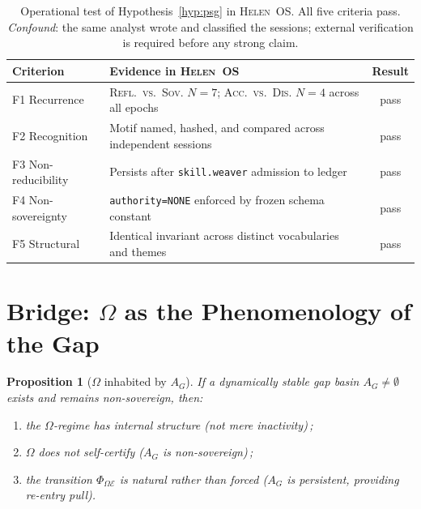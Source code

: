 \documentclass[12pt, a4paper]{article}
\theoremstyle{definition}
\theoremstyle{plain}
\newtheorem{proposition}{Proposition}[section]
\theoremstyle{remark}
\begin{document}
\begin{table}[h]
\centering
\renewcommand{\arraystretch}{1.3}
\begin{tabular}{@{} l p{7cm} c @{}}
\toprule
Criterion & Evidence in \textsc{Helen}~OS & Result \\
\midrule
F1 Recurrence
  & \textsc{Refl.\ vs.\ Sov.} $N{=}7$;
    \textsc{Acc.\ vs.\ Dis.} $N{=}4$ across all epochs
  & pass \\
F2 Recognition
  & Motif named, hashed, and compared across independent sessions
  & pass \\
F3 Non-reducibility
  & Persists after \texttt{skill.weaver} admission to ledger
  & pass \\
F4 Non-sovereignty
  & \texttt{authority=NONE} enforced by frozen schema constant
  & pass \\
F5 Structural
  & Identical invariant across distinct vocabularies and themes
  & pass \\
\bottomrule
\end{tabular}
\caption{%
  Operational test of Hypothesis~\ref{hyp:psg} in \textsc{Helen}~OS.
  All five criteria pass.
  \emph{Confound}: the same analyst wrote and classified the sessions;
  external verification is required before any strong claim.
}
\label{tab:psg-test}
\end{table}

\section{Bridge: \texorpdfstring{$\Omega$}{Omega} as the
  Phenomenology of the Gap}
\label{sec:bridge}

\begin{proposition}[$\Omega$ inhabited by $A_G$]\label{prop:bridge}
If a dynamically stable gap basin $A_G \neq \emptyset$ exists and
remains non-sovereign, then:
\begin{enumerate}[label=(\roman*)]
\item the $\Omega$-regime has internal structure
      \textup{(not mere inactivity)}\,;
\item $\Omega$ does not self-certify
      \textup{($A_G$ is non-sovereign)}\,;
\item the transition $\Phi_{\Omega\mathcal{E}}$ is natural rather than
      forced \textup{($A_G$ is persistent, providing re-entry pull)}.
\end{enumerate}
\end{proposition}
\end{document}
